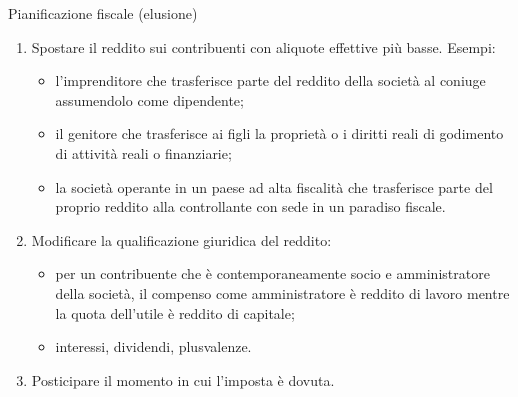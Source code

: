 \documentclass[aspectratio=64,12pt]{beamer}
\begin{document}
\begin{frame}{Pianificazione fiscale (elusione)}
\begin{enumerate}
\item Spostare il reddito sui contribuenti con aliquote effettive più basse. Esempi:  
\begin{itemize}
\item l'imprenditore che trasferisce parte del reddito della società al coniuge
  assumendolo come dipendente;
\item il genitore che trasferisce ai figli la proprietà o i diritti reali di
  godimento di attività reali o finanziarie;
\item la società operante in un paese ad alta fiscalità che trasferisce parte
  del proprio reddito alla controllante con sede in un paradiso fiscale.
\end{itemize}
\item Modificare la qualificazione giuridica del reddito:
\begin{itemize}
\item per un contribuente che è contemporaneamente socio e amministratore della
società, il compenso come amministratore è reddito di lavoro mentre la
quota dell’utile è reddito di capitale;
\item interessi, dividendi, plusvalenze.
\end{itemize}
\item Posticipare il momento in cui l’imposta è dovuta.
\end{enumerate}
\end{frame}
\end{document}
